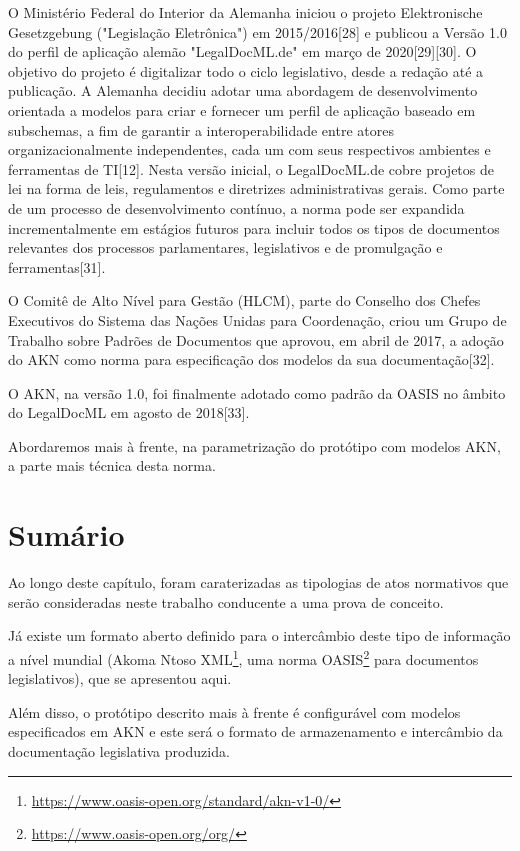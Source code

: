 O Ministério Federal do Interior da Alemanha iniciou o projeto Elektronische Gesetzgebung ("Legislação Eletrônica") 
em 2015/2016[28] e publicou a Versão 1.0 do perfil de aplicação alemão "LegalDocML.de" em março de 2020[29][30]. 
O objetivo do projeto é digitalizar todo o ciclo legislativo, desde a redação até a publicação. 
A Alemanha decidiu adotar uma abordagem de desenvolvimento orientada a modelos para criar e fornecer um perfil de 
aplicação baseado em subschemas, a fim de garantir a interoperabilidade entre atores organizacionalmente independentes, 
cada um com seus respectivos ambientes e ferramentas de TI[12]. 
Nesta versão inicial, o LegalDocML.de cobre projetos de lei na forma de leis, regulamentos e diretrizes administrativas gerais. 
Como parte de um processo de desenvolvimento contínuo, a norma pode ser expandida incrementalmente em estágios futuros para 
incluir todos os tipos de documentos relevantes dos processos parlamentares, legislativos e de promulgação e ferramentas[31].

O Comitê de Alto Nível para Gestão (HLCM), parte do Conselho dos Chefes Executivos do Sistema das Nações Unidas para Coordenação, 
criou um Grupo de Trabalho sobre Padrões de Documentos que aprovou, em abril de 2017, a adoção do AKN como norma 
para especificação dos modelos da sua documentação[32].

O AKN, na versão 1.0, foi finalmente adotado como padrão da OASIS no âmbito do LegalDocML em agosto de 2018[33].

Abordaremos mais à frente, na parametrização do protótipo com modelos AKN, a parte mais técnica desta norma.

\section{Sumário}

Ao longo deste capítulo, foram caraterizadas as tipologias de atos normativos que serão 
consideradas neste trabalho conducente a uma prova de conceito.

Já existe um formato aberto definido para o intercâmbio deste tipo de informação a nível mundial 
(Akoma Ntoso XML\footnote{\url{https://www.oasis-open.org/standard/akn-v1-0/}}, 
uma norma OASIS\footnote{\url{https://www.oasis-open.org/org/}} para documentos legislativos), que se apresentou aqui.

Além disso, o protótipo descrito mais à frente é configurável com modelos especificados em AKN e este será o formato de 
armazenamento e intercâmbio da documentação legislativa produzida.



